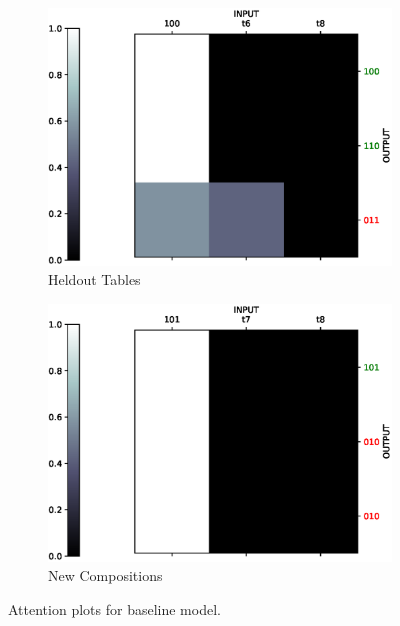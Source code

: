\begin{figure}[ht] 
	\begin{subfigure}[b]{0.5\linewidth}
		\centering
		\includegraphics[width=0.95\linewidth]{./figs/lookup/attn/baseline1-eps}
		\caption{Heldout Tables} 
		\label{bs_attn1} 
		\vspace{2ex}
	\end{subfigure}%
	\begin{subfigure}[b]{0.5\linewidth}
		\centering
		\includegraphics[width=0.95\linewidth]{./figs/lookup/attn/baseline2-eps}
		\caption{New Compositions} 
		\label{bs_attn2} 
		\vspace{2ex}
	\end{subfigure}
	\caption{Attention plots for baseline model.}
	\label{bs_attn}
\end{figure}

